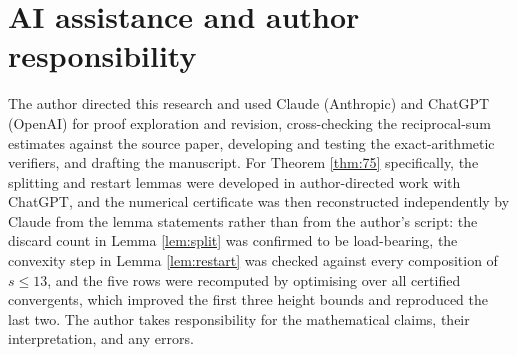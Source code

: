\documentclass[11pt,a4paper]{article}
\theoremstyle{plain}\newtheorem{theorem}{Theorem}\newtheorem{proposition}[theorem]{Proposition}
\theoremstyle{definition}\newtheorem{example}[theorem]{Example}
\theoremstyle{remark}\newtheorem{remark}[theorem]{Remark}
\begin{document}
\section*{AI assistance and author responsibility}
The author directed this research and used Claude (Anthropic) and ChatGPT (OpenAI) for
proof exploration and revision, cross-checking the reciprocal-sum estimates against the
source paper, developing and testing the exact-arithmetic verifiers, and drafting the
manuscript. For Theorem \ref{thm:75} specifically, the splitting and restart lemmas were
developed in author-directed work with ChatGPT, and the numerical certificate was then
reconstructed independently by Claude from the lemma statements rather than from the author's
script: the discard count in Lemma \ref{lem:split} was confirmed to be load-bearing, the
convexity step in Lemma \ref{lem:restart} was checked against every composition of $s\le13$,
and the five rows were recomputed by optimising over all certified convergents, which improved
the first three height bounds and reproduced the last two. The author takes responsibility for the mathematical
claims, their interpretation, and any errors.
\end{document}
